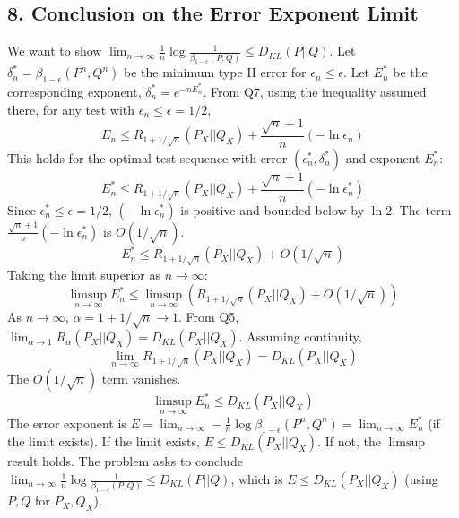 \documentclass{article}
\begin{document}
\subsection*{8. Conclusion on the Error Exponent Limit}

We want to show $\lim_{n\to\infty} \frac{1}{n} \log \frac{1}{\beta_{1-\epsilon}(P,Q)} \le D_{KL}(P||Q)$.
Let $\delta_n^* = \beta_{1-\epsilon}(P^n, Q^n)$ be the minimum type II error for $\epsilon_n \le \epsilon$. Let $E_n^*$ be the corresponding exponent, $\delta_n^* = e^{-n E_n^*}$.
From Q7, using the inequality assumed there, for any test with $\epsilon_n \le \epsilon=1/2$,
\[ E_n \le R_{1+1/\sqrt{n}}(P_X||Q_X) + \frac{\sqrt{n}+1}{n} (-\ln \epsilon_n) \]
This holds for the optimal test sequence with error $(\epsilon_n^*, \delta_n^*)$ and exponent $E_n^*$:
\[ E_n^* \le R_{1+1/\sqrt{n}}(P_X||Q_X) + \frac{\sqrt{n}+1}{n} (-\ln \epsilon_n^*) \]
Since $\epsilon_n^* \le \epsilon = 1/2$, $(-\ln \epsilon_n^*)$ is positive and bounded below by $\ln 2$. The term $\frac{\sqrt{n}+1}{n}(-\ln \epsilon_n^*)$ is $O(1/\sqrt{n})$.
\[ E_n^* \le R_{1+1/\sqrt{n}}(P_X||Q_X) + O(1/\sqrt{n}) \]
Taking the limit superior as $n \to \infty$:
\[ \limsup_{n\to\infty} E_n^* \le \limsup_{n\to\infty} \left( R_{1+1/\sqrt{n}}(P_X||Q_X) + O(1/\sqrt{n}) \right) \]
As $n \to \infty$, $\alpha = 1 + 1/\sqrt{n} \to 1$. From Q5, $\lim_{\alpha \to 1} R_\alpha(P_X||Q_X) = D_{KL}(P_X||Q_X)$. Assuming continuity,
\[ \lim_{n\to\infty} R_{1+1/\sqrt{n}}(P_X||Q_X) = D_{KL}(P_X||Q_X) \]
The $O(1/\sqrt{n})$ term vanishes.
\[ \limsup_{n\to\infty} E_n^* \le D_{KL}(P_X||Q_X) \]
The error exponent is $E = \lim_{n\to\infty} -\frac{1}{n} \log \beta_{1-\epsilon}(P^n, Q^n) = \lim_{n\to\infty} E_n^*$ (if the limit exists).
If the limit exists, $E \le D_{KL}(P_X||Q_X)$. If not, the $\limsup$ result holds.
The problem asks to conclude $\lim_{n\to\infty} \frac{1}{n} \log \frac{1}{\beta_{1-\epsilon}(P,Q)} \le D_{KL}(P||Q)$, which is $E \le D_{KL}(P_X||Q_X)$ (using $P,Q$ for $P_X,Q_X$).
\end{document}
